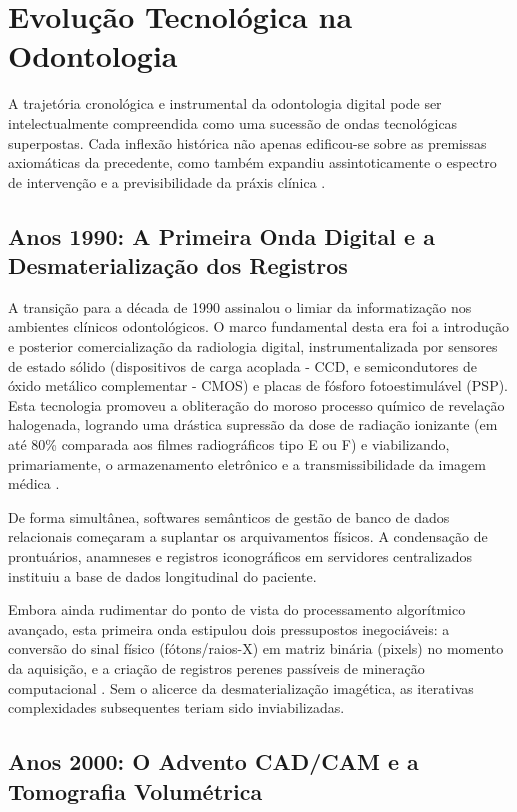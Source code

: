 \section{Evolução Tecnológica na Odontologia}
\label{sec:evolucao}

A trajetória cronológica e instrumental da odontologia digital pode ser intelectualmente compreendida como uma sucessão de ondas tecnológicas superpostas. Cada inflexão histórica não apenas edificou-se sobre as premissas axiomáticas da precedente, como também expandiu assintoticamente o espectro de intervenção e a previsibilidade da práxis clínica \cite{duggal2026exploring}.

\subsection*{Anos 1990: A Primeira Onda Digital e a Desmaterialização dos Registros}

A transição para a década de 1990 assinalou o limiar da informatização nos ambientes clínicos odontológicos. O marco fundamental desta era foi a introdução e posterior comercialização da radiologia digital, instrumentalizada por sensores de estado sólido (dispositivos de carga acoplada - CCD, e semicondutores de óxido metálico complementar - CMOS) e placas de fósforo fotoestimulável (PSP). Esta tecnologia promoveu a obliteração do moroso processo químico de revelação halogenada, logrando uma drástica supressão da dose de radiação ionizante (em até 80\% comparada aos filmes radiográficos tipo E ou F) e viabilizando, primariamente, o armazenamento eletrônico e a transmissibilidade da imagem médica \cite{khoshfekr2025review}. 

De forma simultânea, softwares semânticos de gestão de banco de dados relacionais começaram a suplantar os arquivamentos físicos. A condensação de prontuários, anamneses e registros iconográficos em servidores centralizados instituiu a base de dados longitudinal do paciente.

Embora ainda rudimentar do ponto de vista do processamento algorítmico avançado, esta primeira onda estipulou dois pressupostos inegociáveis: a conversão do sinal físico (fótons/raios-X) em matriz binária (pixels) no momento da aquisição, e a criação de registros perenes passíveis de mineração computacional \cite{mdpi2025convergence}. Sem o alicerce da desmaterialização imagética, as iterativas complexidades subsequentes teriam sido inviabilizadas.

\subsection*{Anos 2000: O Advento CAD/CAM e a Tomografia Volumétrica}

